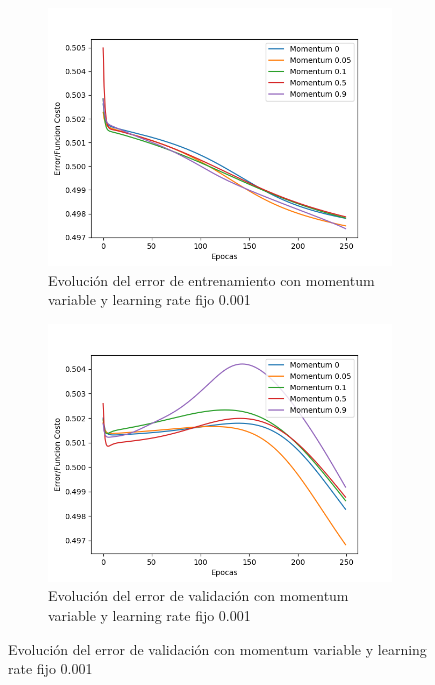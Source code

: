 \begin{figure}[!htbp]
\centering
\begin{subfigure}{.5\textwidth}
  \centering
  \includegraphics[width=1\linewidth]{graficos/eta_x_momentum_promedios_entrenamiento_4.png}
  \caption{Evolución del error de entrenamiento con momentum variable y learning rate fijo 0.001}
  \label{fig:sub1}
\end{subfigure}%
\begin{subfigure}{.5\textwidth}
  \centering
  \includegraphics[width=1\linewidth]{graficos/eta_x_momentum_promedios_validacion_4.png}
  \caption{Evolución del error de validación con momentum variable y learning rate fijo 0.001}
  \label{fig:sub2}
\end{subfigure}
\end{figure}

